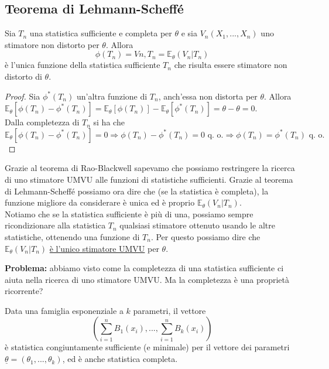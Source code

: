 \subsection{Teorema di Lehmann-Scheffé}

\begin{teo}

Sia $T_n$ una statistica sufficiente e completa per $\theta$ e sia $V_n(X_1,...,X_n)$ uno stimatore non distorto per $\theta$. Allora
$$\phi(T_n) = V{n,T_n} = \mathbb{E}_{\theta}(V_n|T_n)$$
è l'unica funzione della statistica sufficiente $T_n$ che risulta essere stimatore non distorto di $\theta$.

\begin{proof}
Sia $\phi^*(T_n)$ un'altra funzione di $T_n$, anch'essa non distorta per $\theta$. Allora $\mathbb{E}_{\theta}[\phi(T_n)-\phi^*(T_n)] = \mathbb{E}_{\theta}[\phi(T_n)]-\mathbb{E}_{\theta}[\phi^*(T_n)] = \theta - \theta = 0$.\\
Dalla completezza di $T_n$ si ha che 
$$\mathbb{E}_{\theta}[\phi(T_n)-\phi^*(T_n)]=0 \Longrightarrow \phi(T_n)-\phi^*(T_n)=0 \text{ q. o.} \Longrightarrow \phi(T_n)=\phi^*(T_n) \text{ q. o.}$$
\end{proof}
\end{teo}

\begin{oss}[importante]
Grazie al teorema di Rao-Blackwell sapevamo che possiamo restringere la ricerca di uno stimatore UMVU alle funzioni di statistiche sufficienti. Grazie al teorema di Lehmann-Scheffé possiamo ora dire che (se la statistica è completa), la funzione migliore da considerare è unica ed è proprio $\mathbb{E}_{\theta}(V_n|T_n)$.\\
Notiamo che se la statistica sufficiente è più di una, possiamo sempre ricondizionare alla statistica $T_n$ qualsiasi stimatore ottenuto usando le altre statistiche, ottenendo una funzione di $T_n$. Per questo possiamo dire che $\mathbb{E}_{\theta}(V_n|T_n)$ \underline{è l'unico stimatore UMVU} per $\theta$.
\end{oss}

\textbf{Problema:} abbiamo visto come la completezza di una statistica sufficiente ci aiuta nella ricerca di uno stimatore UMVU. Ma la completezza è una proprietà ricorrente?

\begin{teo}
Data una famiglia esponenziale a $k$ parametri, il vettore
$$\left( \sum_{i=1}^n B_1(x_i),...,\sum_{i=1}^n B_k(x_i) \right)$$
è statistica congiuntamente sufficiente (e minimale) per il vettore dei parametri $\underline{\theta}=(\theta_1,...,\theta_k)$, ed è anche statistica completa.
\end{teo}

